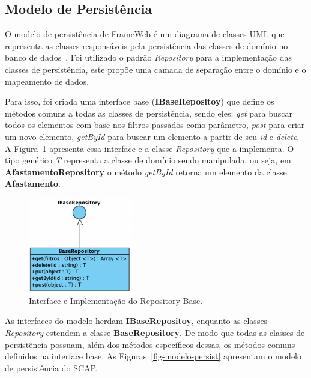 \subsection{Modelo de Persistência}
\label{subsec-frameweb-persistencia}

O modelo de persistência de FrameWeb é um diagrama de classes UML que representa
as classes responsáveis pela persistência das classes de domínio no banco de dados~\cite{souza:2007}.
Foi utilizado o padrão \textit{Repository} para a implementação das classes de persistência,
este propõe uma camada de separação entre o domínio e o mapeamento de dados.


Para isso, foi criada uma interface base (\textbf{IBaseRepositoy}) que define os métodos comuns a todas as classes de persistência,
sendo eles: \textit{get} para buscar todos os elementos com base nos filtros passados como parâmetro,
\textit{post} para criar um novo elemento, \textit{getById} para buscar um elemento a partir de seu
\textit{id} e \textit{delete}. A Figura~\ref{fig-modelo-persist-base} apresenta essa interface e a
classe \textit{Repository} que a implementa. O tipo genérico \textit{T} representa a classe de domínio
sendo manipulada, ou seja, em \textbf{AfastamentoRepository} o método \textit{getById}
retorna um elemento da classe \textbf{Afastamento}.


\begin{figure}[h!]
    \centering
    \includegraphics[width=0.4\textwidth]{figuras/fig-modelo-persist-base.png}
    \caption{Interface e Implementação do Repository Base.}
    \label{fig-modelo-persist-base}
\end{figure}


As interfaces do modelo herdam \textbf{IBaseRepositoy}, enquanto as classes \textit{Repository} estendem a
classe \textbf{BaseRepository}. De modo que todas as classes de persistência possuam, além dos métodos
específicos dessas, os métodos comuns definidos na interface base. As Figuras~\ref{fig-modelo-persist}
apresentam o modelo de persistência do SCAP.

